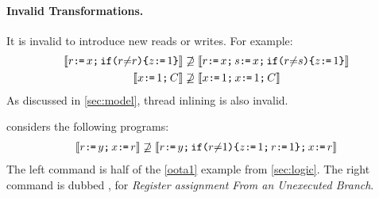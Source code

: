 



\paragraph{Invalid Transformations.}
It is invalid to introduce new reads or writes.  For example:
\begin{align*}
  \sem{\aReg \GETS \aLoc \SEMI \IF{\aReg {\neq} \aReg} \THEN \cLoc \GETS 1 \FI}
  &\not\supseteq
  \sem{\aReg \GETS \aLoc \SEMI \bReg \GETS \aLoc  \SEMI \IF{\aReg {\neq}\bReg} \THEN \cLoc \GETS 1 \FI}
  \\
  \sem{\aLoc \GETS 1 \SEMI \aCmd} 
  &\not\supseteq
  \sem{\aLoc \GETS 1 \SEMI \aLoc \GETS 1 \SEMI \aCmd}
\end{align*}
As discussed in \textsection\ref{sec:model}, thread inlining is also invalid.

\citet{BoehmOOTA} considers the following programs:
\begin{gather*}
  \sem{r\GETS y\SEMI x\GETS r}
  \not\supseteq
  \sem{r\GETS y\SEMI \IF{r \NOTEQ 1} \THEN z\GETS 1\SEMI r\GETS 1\FI \SEMI x\GETS r}
\end{gather*}
The left command is half of the \eqref{oota1} example from
\textsection\ref{sec:logic}.  The right command is dubbed \rfub{}, for
\emph{Register assignment From an Unexecuted Branch}.

